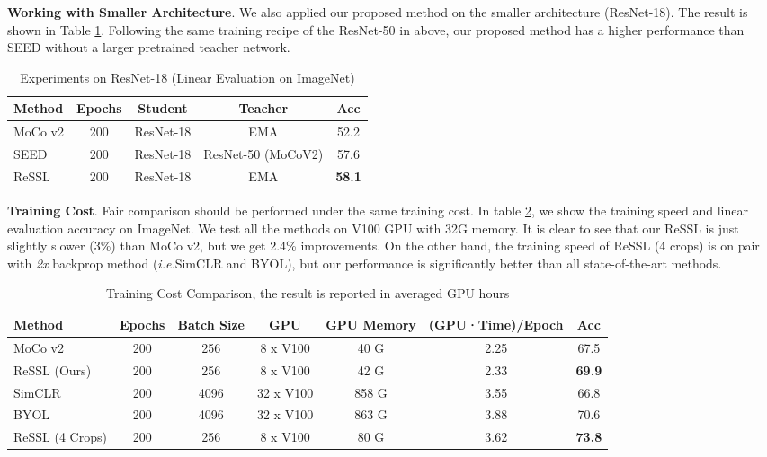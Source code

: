 \documentclass{article}
\newcommand{\<}{\left\langle}
\renewcommand{\>}{\right\rangle}
\newcommand{\ie}{{\emph{i.e.}}}
\begin{document}
\textbf{Working with Smaller Architecture}.
We also applied our proposed method on the smaller architecture (ResNet-18). The result is shown in Table \ref{table:res18}. Following the same training recipe of the ResNet-50 in above, our proposed method has a higher performance than SEED \cite{seed} without a larger pretrained teacher network.

\renewcommand\arraystretch{1.12}
\begin{table}[h]
 \centering
 \setlength\tabcolsep{10pt}
 \small
 \caption{Experiments on ResNet-18 (Linear Evaluation on ImageNet)}
 \vspace{-5pt}
 \label{table:res18}
\begin{tabular}{l c c c c }
\toprule 
Method & Epochs & Student & Teacher & Acc  \\ \hline
MoCo v2 & 200 & ResNet-18 & EMA & 52.2 \\
SEED & 200 & ResNet-18 & ResNet-50 (MoCoV2) & 57.6 \\
ReSSL & 200 & ResNet-18 & EMA &  \textbf{58.1} \\
\toprule 
\end{tabular}
\end{table}




\textbf{Training Cost}. 
Fair comparison should be performed under the same training cost. In table \ref{table:training_cost}, we show the training speed and linear evaluation accuracy on ImageNet.  We test all the methods on V100 GPU with 32G memory. It is clear to see that our ReSSL is just slightly slower (3\%) than MoCo v2, but we get 2.4\% improvements. On the other hand, the training speed of ReSSL (4 crops) is on pair with \emph{2x} backprop method (\ie SimCLR and BYOL), but our performance is significantly better than all state-of-the-art methods.


\begin{table}[h]
 \centering
 \small
 \caption{Training Cost Comparison, the result is reported in averaged GPU hours}
 \vspace{-5pt}
 \label{table:training_cost}
\begin{tabular}{l  c  c c c c c} 
\toprule 
Method & Epochs & Batch Size &  GPU & GPU Memory & (GPU·Time)/Epoch & Acc \\ \hline
MoCo v2       & 200  & 256   & 8 x V100  & 40 G & 2.25 & 67.5   \\
ReSSL (Ours)  & 200  & 256   & 8 x V100  & 42 G & 2.33 & \textbf{69.9}   \\ \hline
SimCLR        & 200  & 4096  & 32 x V100 & 858 G & 3.55 & 66.8  \\ 
BYOL          & 200  & 4096  & 32 x V100 & 863 G & 3.88 & 70.6   \\
ReSSL  (4 Crops) & 200  & 256  & 8 x V100 & 80 G & 3.62 & \textbf{73.8}    \\
\toprule 
\end{tabular}
\end{table}
\end{document}
